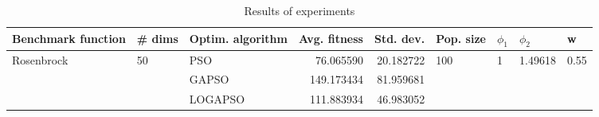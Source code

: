 \begin{table}
\centering
\caption{Results of experiments}
\begin{tabular}{lllrrllll}
\toprule
         Benchmark function &             \# dims & Optim. algorithm &  Avg. fitness &  Std. dev. &            Pop. size &         $\phi_{1}$ &               $\phi_{2}$ &                     w \\
\midrule
\multirow{3}{*}{Rosenbrock} & \multirow{3}{*}{50} &              PSO &     76.065590 &  20.182722 & \multirow{3}{*}{100} & \multirow{3}{*}{1} & \multirow{3}{*}{1.49618} & \multirow{3}{*}{0.55} \\
                            &                     &            GAPSO &    149.173434 &  81.959681 &                      &                    &                          &                       \\
                            &                     &          LOGAPSO &    111.883934 &  46.983052 &                      &                    &                          &                       \\
\bottomrule
\end{tabular}
\end{table}
